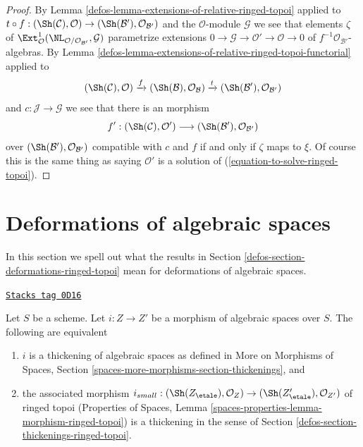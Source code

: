 \begin{proof}

By Lemma \ref{defos-lemma-extensions-of-relative-ringed-topoi}
applied to $t \circ f : (\Sh(\mathcal{C}), \mathcal{O}) \to
(\Sh(\mathcal{B}'), \mathcal{O}_{\mathcal{B}'})$
and the $\mathcal{O}$-module $\mathcal{G}$
we see that elements $\zeta$ of
$\Ext^1_\mathcal{O}(\NL_{\mathcal{O}/\mathcal{O}_{\mathcal{B}'}},
\mathcal{G})$
parametrize extensions
$0 \to \mathcal{G} \to \mathcal{O}' \to \mathcal{O} \to 0$
of $f^{-1}\mathcal{O}_{\mathcal{B}'}$-algebras. By
Lemma \ref{defos-lemma-extensions-of-relative-ringed-topoi-functorial} applied
to
$$
(\Sh(\mathcal{C}), \mathcal{O}) \xrightarrow{f}
(\Sh(\mathcal{B}), \mathcal{O}_\mathcal{B}) \xrightarrow{t}
(\Sh(\mathcal{B}'), \mathcal{O}_{\mathcal{B}'})
$$
and $c : \mathcal{J} \to \mathcal{G}$
we see that there is an morphism
$$
f' :
(\Sh(\mathcal{C}), \mathcal{O}')
\longrightarrow
(\Sh(\mathcal{B}'), \mathcal{O}_{\mathcal{B}'})
$$
over $(\Sh(\mathcal{B}'), \mathcal{O}_{\mathcal{B}'})$
compatible with $c$ and $f$ if and only if
$\zeta$ maps to $\xi$. Of course this is the same thing as saying
$\mathcal{O}'$ is a solution of (\ref{equation-to-solve-ringed-topoi}).
\end{proof}

\section{Deformations of algebraic spaces}
\label{defos-section-deformations-spaces}
In this section we spell out what the results in
Section \ref{defos-section-deformations-ringed-topoi}
mean for deformations of algebraic spaces.

\begin{lemma}
\label{defos-lemma-match-thickenings}
\href{https://stacks.math.columbia.edu/tag/0D16}{\texttt{Stacks tag 0D16}}

Let $S$ be a scheme. Let $i : Z \to Z'$ be a morphism of algebraic spaces
over $S$. The following are equivalent
\begin{enumerate}
\item $i$ is a thickening of algebraic spaces as defined
in More on Morphisms of Spaces, Section
\ref{spaces-more-morphisms-section-thickenings}, and
\item the associated morphism
$i_{small} : (\Sh(Z_\etale), \mathcal{O}_Z) \to
(\Sh(Z'_\etale), \mathcal{O}_{Z'})$
of ringed topoi (Properties of Spaces, Lemma
\ref{spaces-properties-lemma-morphism-ringed-topoi})
is a thickening in the sense of
Section \ref{defos-section-thickenings-ringed-topoi}.
\end{enumerate}
\end{lemma}

